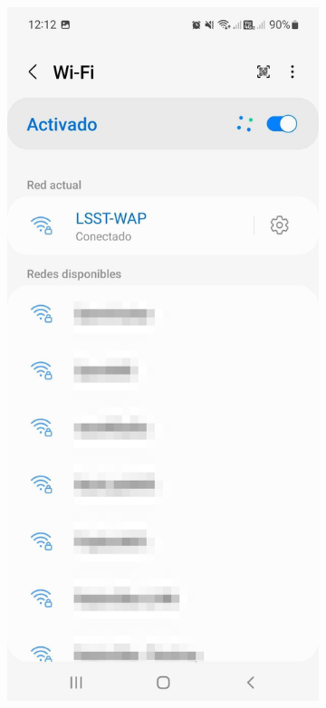 \begin{figure}
\begin{subfigure}{0.40\textwidth}
    \end{subfigure}
      \hfill
    \begin{subfigure}{0.40\textwidth}
      \includegraphics[width=\textwidth]{Images/Android4.png}
    \end{subfigure}
  \end{figure}


